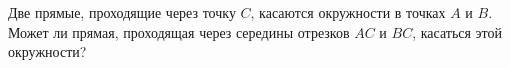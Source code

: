 \begin{ex}
	\begin{condition}
		Две прямые, проходящие через точку \( C \), касаются окружности в точках \( A  \) и \( B \). Может ли прямая, проходящая через середины отрезков \( AC  \) и \( BC \), касаться этой окружности?
	\end{condition}
\end{ex}